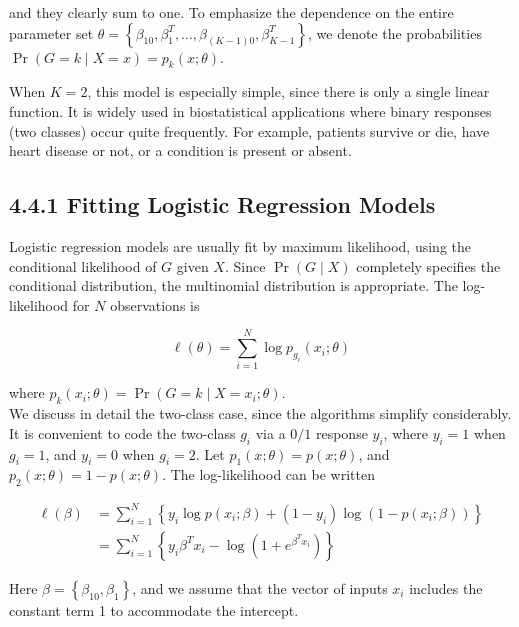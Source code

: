 \documentclass[10pt]{article}
\begin{document}
and they clearly sum to one. To emphasize the dependence on the entire parameter set $\theta=\left\{\beta_{10}, \beta_{1}^{T}, \ldots, \beta_{(K-1) 0}, \beta_{K-1}^{T}\right\}$, we denote the probabilities $\operatorname{Pr}(G=k \mid X=x)=p_{k}(x ; \theta)$.

When $K=2$, this model is especially simple, since there is only a single linear function. It is widely used in biostatistical applications where binary responses (two classes) occur quite frequently. For example, patients survive or die, have heart disease or not, or a condition is present or absent.

\subsection*{4.4.1 Fitting Logistic Regression Models}
Logistic regression models are usually fit by maximum likelihood, using the conditional likelihood of $G$ given $X$. Since $\operatorname{Pr}(G \mid X)$ completely specifies the conditional distribution, the multinomial distribution is appropriate. The log-likelihood for $N$ observations is


\begin{equation*}
\ell(\theta)=\sum_{i=1}^{N} \log p_{g_{i}}\left(x_{i} ; \theta\right) \tag{4.19}
\end{equation*}


where $p_{k}\left(x_{i} ; \theta\right)=\operatorname{Pr}\left(G=k \mid X=x_{i} ; \theta\right)$.\\
We discuss in detail the two-class case, since the algorithms simplify considerably. It is convenient to code the two-class $g_{i}$ via a $0 / 1$ response $y_{i}$, where $y_{i}=1$ when $g_{i}=1$, and $y_{i}=0$ when $g_{i}=2$. Let $p_{1}(x ; \theta)=p(x ; \theta)$, and $p_{2}(x ; \theta)=1-p(x ; \theta)$. The log-likelihood can be written


\begin{align*}
\ell(\beta) & =\sum_{i=1}^{N}\left\{y_{i} \log p\left(x_{i} ; \beta\right)+\left(1-y_{i}\right) \log \left(1-p\left(x_{i} ; \beta\right)\right)\right\} \\
& =\sum_{i=1}^{N}\left\{y_{i} \beta^{T} x_{i}-\log \left(1+e^{\beta^{T} x_{i}}\right)\right\} \tag{4.20}
\end{align*}


Here $\beta=\left\{\beta_{10}, \beta_{1}\right\}$, and we assume that the vector of inputs $x_{i}$ includes the constant term 1 to accommodate the intercept.
\end{document}
